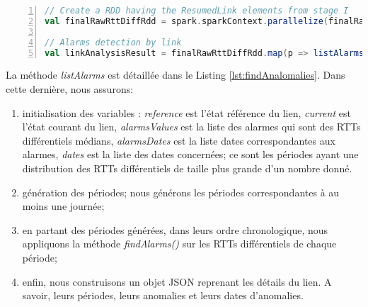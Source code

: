 \begin{lstlisting}[language=scala,firstnumber=1, caption={Détection des alarmes des liens},label={lst:paralelizeAndDtectAnomalies}, basicstyle = \footnotesize,escapechar=|,numbers=left,
stepnumber=1]
// Create a RDD having the ResumedLink elements from stage I
val finalRawRttDiffRdd = spark.sparkContext.parallelize(finalRawRttDiff.toSeq) |\label{parallelizefinalRawRttDiff}|

// Alarms detection by link
val linkAnalysisResult = finalRawRttDiffRdd.map(p => listAlarms(spark, p, timewindow, rangeDates)) |\label{listAlarmscall}|
\end{lstlisting}

La méthode \textit{listAlarms} est détaillée dans le Listing \ref{lst:findAnalomalies}. Dans cette dernière, nous assurons:


\begin{enumerate}
	\item initialisation des variables : \textit{reference} est l'état référence du lien, \textit{current} est l'état courant du lien, \textit{alarmsValues} est la liste des alarmes qui sont des RTTs différentiels médians, \textit{alarmsDates} est la liste dates correspondantes aux alarmes, \textit{dates} est la liste des dates concernées; ce sont les périodes ayant une distribution des RTTs différentiels de taille plus grande d'un nombre donné.
	\item  génération des périodes; nous générons les périodes correspondantes à au moins une journée;
    \item  en partant des périodes générées, dans leurs ordre chronologique, nous appliquons la méthode \textit{findAlarms()} sur les RTTs différentiels de chaque période;
    \item enfin, nous construisons un objet JSON reprenant les détails du lien. A savoir, leurs périodes, leurs anomalies et leurs dates d'anomalies. 
\end{enumerate}

